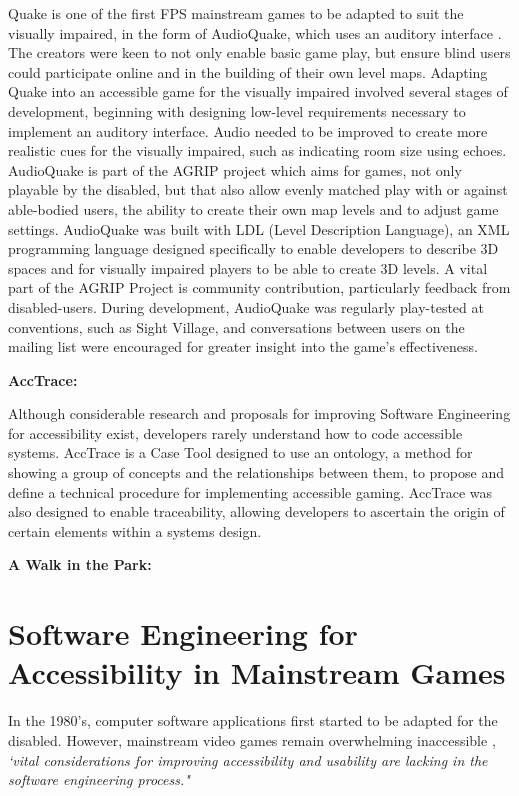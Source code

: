 \documentclass{scrartcl}
\begin{document}
Quake \cite{4} is one of the first FPS mainstream games to be adapted to suit the visually impaired, in the form of AudioQuake, which uses an auditory interface \cite{5}. The creators were keen to not only enable basic game play, but ensure blind users could participate online and in the building of their own level maps. Adapting Quake into an accessible game for the visually impaired involved several stages of development, beginning with designing low-level requirements necessary to implement an auditory interface. Audio needed to be improved to create more realistic cues for the visually impaired, such as indicating room size using echoes. AudioQuake is part of the AGRIP project \cite{6} which aims for games, not only playable by the disabled, but that also allow evenly matched play with or against able-bodied users, the ability to create their own map levels and to adjust game settings. AudioQuake was built with LDL (Level Description Language), an XML programming language designed specifically to enable developers to describe 3D spaces and for visually impaired players to be able to create 3D levels. A vital part of the AGRIP Project is community contribution, particularly feedback from disabled-users. During development, AudioQuake was regularly play-tested at conventions, such as Sight Village, and conversations between users on the mailing list were encouraged for greater insight into the game's effectiveness.

\textbf{AccTrace:}

Although considerable research and proposals for improving Software Engineering for accessibility exist, developers rarely understand how to code accessible systems. AccTrace \cite{12} is a Case Tool designed to use an ontology, a method for showing a group of concepts and the relationships between them, to propose and define a technical procedure for implementing accessible gaming. AccTrace was also designed to enable traceability, allowing developers to ascertain the origin of certain elements within a systems design. \cite{12}

\textbf{A Walk in the Park:}

\section{Software Engineering for Accessibility in Mainstream Games}
In the  1980's, computer software applications first started to be adapted for the disabled. However, mainstream video games remain overwhelming inaccessible \cite{13}, \textit{`vital considerations for improving accessibility and usability are lacking in the software engineering process."} \cite{15}
\end{document}

